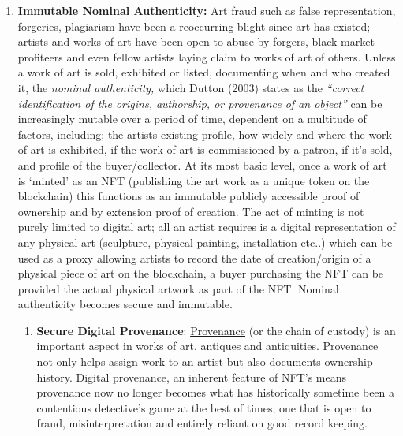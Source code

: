 \begin{enumerate}
\def\labelenumi{\arabic{enumi}.}
\item
  \textbf{Immutable Nominal Authenticity:} Art fraud such as false
  representation, forgeries, plagiarism have been a reoccurring blight
  since art has existed; artists and works of art have been open to
  abuse by forgers, black market profiteers and even fellow artists
  laying claim to works of art of others. Unless a work of art is sold,
  exhibited or listed, documenting when and who created it, the
  \emph{nominal authenticity,} which Dutton (2003) states as the
  \emph{``correct identification of the origins, authorship, or
  provenance of an object''} can be increasingly mutable over a period
  of time, dependent on a multitude of factors, including; the artists
  existing profile, how widely and where the work of art is exhibited,
  if the work of art is commissioned by a patron, if it's sold, and
  profile of the buyer/collector. At its most basic level, once a work
  of art is `minted' as an NFT (publishing the art work as a unique
  token on the blockchain) this functions as an immutable publicly
  accessible proof of ownership and by extension proof of creation. The
  act of minting is not purely limited to digital art; all an artist
  requires is a digital representation of any physical art (sculpture,
  physical painting, installation etc..) which can be used as a proxy
  allowing artists to record the date of creation/origin of a physical
  piece of art on the blockchain, a buyer purchasing the NFT can be
  provided the actual physical artwork as part of the NFT. Nominal
  authenticity becomes secure and immutable.

  \begin{enumerate}
  \def\labelenumii{\alph{enumii}.}
  \item
    \textbf{Secure Digital Provenance}:
    \href{https://en.wikipedia.org/wiki/Provenance}{Provenance} (or the
    chain of custody) is an important aspect in works of art, antiques
    and antiquities. Provenance not only helps assign work to an artist
    but also documents ownership history. Digital provenance, an
    inherent feature of NFT's means provenance now no longer becomes
    what has historically sometime been a contentious detective's game
    at the best of times; one that is open to fraud, misinterpretation
    and entirely reliant on good record keeping.
  \end{enumerate}
\end{enumerate}

